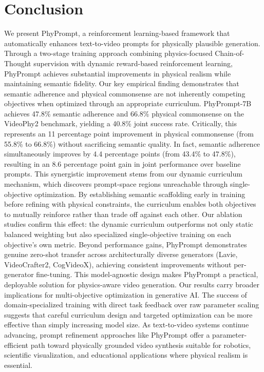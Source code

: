 \section{Conclusion}
We present PhyPrompt, a reinforcement learning-based framework that automatically enhances text-to-video prompts for physically plausible generation. Through a two-stage training approach combining physics-focused Chain-of-Thought supervision with dynamic reward-based reinforcement learning, PhyPrompt achieves substantial improvements in physical realism while maintaining semantic fidelity.
Our key empirical finding demonstrates that semantic adherence and physical commonsense are not inherently competing objectives when optimized through an appropriate curriculum. PhyPrompt-7B achieves 47.8\% semantic adherence and 66.8\% physical commonsense on the VideoPhy2 benchmark, yielding a 40.8\% joint success rate. Critically, this represents an 11 percentage point improvement in physical commonsense (from 55.8\% to 66.8\%) without sacrificing semantic quality. In fact, semantic adherence simultaneously improves by 4.4 percentage points (from 43.4\% to 47.8\%), resulting in an 8.6 percentage point gain in joint performance over baseline prompts.
This synergistic improvement stems from our dynamic curriculum mechanism, which discovers prompt-space regions unreachable through single-objective optimization. By establishing semantic scaffolding early in training before refining with physical constraints, the curriculum enables both objectives to mutually reinforce rather than trade off against each other. Our ablation studies confirm this effect: the dynamic curriculum outperforms not only static balanced weighting but also specialized single-objective training on each objective's own metric. Beyond performance gains, PhyPrompt demonstrates genuine zero-shot transfer across architecturally diverse generators (Lavie, VideoCrafter2, CogVideoX), achieving consistent improvements without per-generator fine-tuning. This model-agnostic design makes PhyPrompt a practical, deployable solution for physics-aware video generation.
Our results carry broader implications for multi-objective optimization in generative AI. The success of domain-specialized training with direct task feedback over raw parameter scaling suggests that careful curriculum design and targeted optimization can be more effective than simply increasing model size. As text-to-video systems continue advancing, prompt refinement approaches like PhyPrompt offer a parameter-efficient path toward physically grounded video synthesis suitable for robotics, scientific visualization, and educational applications where physical realism is essential.

